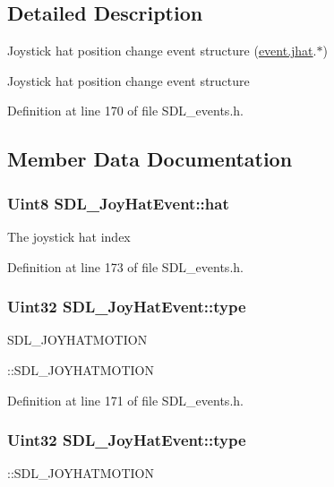\subsection{Detailed Description}
Joystick hat position change event structure (\hyperlink{unionSDL__Event_a421b40e0f8e01f181c8d5548cff1dd1d}{event.\+jhat}.$\ast$) 

Joystick hat position change event structure 

Definition at line 170 of file S\+D\+L\+\_\+events.\+h.



\subsection{Member Data Documentation}
\hypertarget{structSDL__JoyHatEvent_ab1b54a6d1091e583e856f86b5af1e2f6}{
\subsubsection[{hat}]{\setlength{\rightskip}{0pt plus 5cm}Uint8 S\+D\+L\+\_\+\+Joy\+Hat\+Event\+::hat}}\label{structSDL__JoyHatEvent_ab1b54a6d1091e583e856f86b5af1e2f6}
The joystick hat index 

Definition at line 173 of file S\+D\+L\+\_\+events.\+h.

\hypertarget{structSDL__JoyHatEvent_ac583dafab46c44354e210a542aff57cc}{
\subsubsection[{type}]{\setlength{\rightskip}{0pt plus 5cm}Uint32 S\+D\+L\+\_\+\+Joy\+Hat\+Event\+::type}}\label{structSDL__JoyHatEvent_ac583dafab46c44354e210a542aff57cc}
S\+D\+L\+\_\+\+J\+O\+Y\+H\+A\+T\+M\+O\+T\+I\+O\+N

\+::\+S\+D\+L\+\_\+\+J\+O\+Y\+H\+A\+T\+M\+O\+T\+I\+O\+N 

Definition at line 171 of file S\+D\+L\+\_\+events.\+h.

\hypertarget{structSDL__JoyHatEvent_ac583dafab46c44354e210a542aff57cc}{
\subsubsection[{type}]{\setlength{\rightskip}{0pt plus 5cm}Uint32 S\+D\+L\+\_\+\+Joy\+Hat\+Event\+::type}}\label{structSDL__JoyHatEvent_ac583dafab46c44354e210a542aff57cc}
\+::\+S\+D\+L\+\_\+\+J\+O\+Y\+H\+A\+T\+M\+O\+T\+I\+O\+N 


